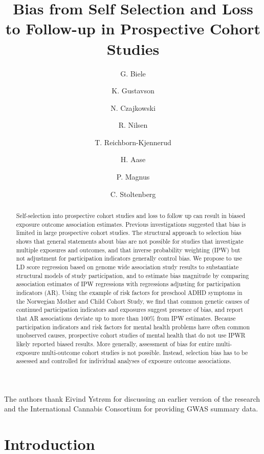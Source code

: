 \documentclass[]{article}
\title{Bias from Self Selection and Loss to Follow-up in Prospective Cohort Studies}
\author{G. Biele \and K. Gustavson \and N. Czajkowski \and R. Nilsen \and T. Reichborn-Kjennerud \and H. Aase \and P. Magnus \and C. Stoltenberg}
\begin{document}
\begin{titlepage}
	\maketitle
	\begin{abstract}
		Self-selection into prospective cohort studies and loss to follow up can result in biased exposure outcome association estimates. Previous investigations suggested that bias is limited in large prospective cohort studies. The structural approach to selection bias shows that general statements about bias are not possible for studies that investigate multiple exposures and outcomes, and that inverse probability weighting (IPW) but not adjustment for participation indicators generally control bias. We propose to use LD score regression based on genome wide association study results to substantiate structural models of study participation, and to estimate bias magnitude by comparing association estimates of IPW regressions with regressions adjusting for participation indicators (AR). Using the example of risk factors for preschool ADHD symptoms in the Norwegian Mother and Child Cohort Study, we find that common genetic causes of continued participation indicators and exposures suggest presence of bias, and report that AR associations deviate up to more than 100\% from IPW estimates. Because participation indicators and risk factors for mental health problems have often common unobserved causes, prospective cohort studies of mental health that do not use IPWR likely reported biased results. More generally, assessment of bias for entire multi-exposure multi-outcome cohort studies is not possible. Instead, selection bias has to be assessed and controlled for individual analyses of exposure outcome associations.
	\end{abstract}


The authors thank Eivind Ystrøm for discussing an earlier version of the research and the International Cannabis Consortium for providing GWAS summary data.
\end{titlepage}
\section{Introduction}
\end{document}
